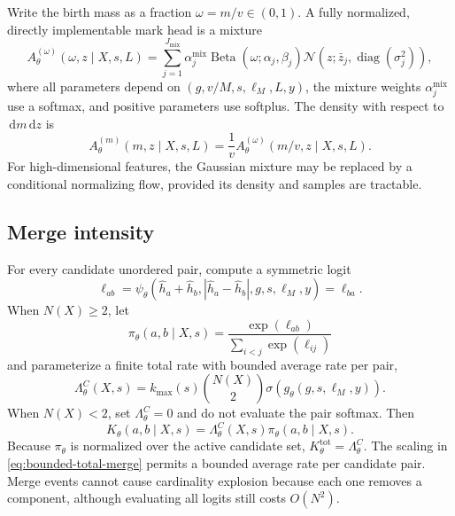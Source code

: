 \documentclass[10pt]{article}
\theoremstyle{definition}
\theoremstyle{remark}
\newcommand{\dd}{\,\mathrm{d}}
\begin{document}
Write the birth mass as a fraction $\omega=m/v\in(0,1)$.  A fully
normalized, directly implementable mark head is a mixture
\begin{equation}
  A_\theta^{(\omega)}(\omega,z\mid X,s,L)
  =\sum_{j=1}^{J_{\mathrm{mix}}}\alpha_j^{\mathrm{mix}}
  \operatorname{Beta}(\omega;\alpha_j,\beta_j)
  \mathcal N(z;\bar z_j,\operatorname{diag}(\sigma_j^2)),
  \label{eq:birth-mixture}
\end{equation}
where all parameters depend on $(g,v/M,s,\ell_M,L,y)$, the mixture weights
$\alpha_j^{\mathrm{mix}}$ use a softmax, and positive parameters use
softplus.  The density with respect to $\dd m\dd z$ is
\begin{equation}
  A_\theta^{(m)}(m,z\mid X,s,L)
  =\frac{1}{v}A_\theta^{(\omega)}(m/v,z\mid X,s,L).
  \label{eq:birth-density-jacobian}
\end{equation}
For high-dimensional features, the Gaussian mixture may be replaced by a conditional normalizing flow, provided its density and samples are tractable.

\subsection{Merge intensity}

For every candidate unordered pair, compute a symmetric logit
\begin{equation}
  \ell_{ab}
  =\psi_\theta(\widehat h_a+\widehat h_b,
                |\widehat h_a-\widehat h_b|,
                g,s,\ell_M,y)
  =\ell_{ba}.
  \label{eq:pair-logit}
\end{equation}
When $N(X)\geq2$, let
\begin{equation}
  \pi_\theta(a,b\mid X,s)
  =\frac{\exp(\ell_{ab})}{\sum_{i<j}\exp(\ell_{ij})}
  \label{eq:pair-softmax}
\end{equation}
and parameterize a finite total rate with bounded average rate per pair,
\begin{equation}
  \Lambda_\theta^C(X,s)
  =k_{\max}(s)\binom{N(X)}{2}
  \sigma\!\left(g_\theta(g,s,\ell_M,y)\right).
  \label{eq:bounded-total-merge}
\end{equation}
When $N(X)<2$, set $\Lambda_\theta^C=0$ and do not evaluate the pair softmax.
Then
\begin{equation}
  K_\theta(a,b\mid X,s)
  =\Lambda_\theta^C(X,s)\pi_\theta(a,b\mid X,s).
  \label{eq:factorized-merge-rate}
\end{equation}
Because $\pi_\theta$ is normalized over the active candidate set,
$K_\theta^{\mathrm{tot}}=\Lambda_\theta^C$.
The scaling in \eqref{eq:bounded-total-merge} permits a bounded average rate
per candidate pair.  Merge events cannot cause cardinality explosion because
each one removes a component, although evaluating all logits still costs
$O(N^2)$.
\end{document}
